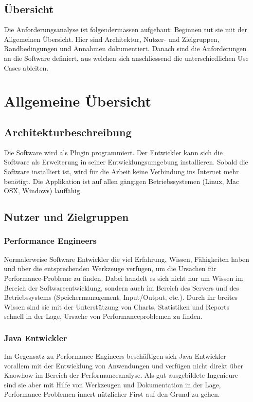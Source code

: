 \subsection{Übersicht}
Die Anforderungsanalyse ist folgendermassen aufgebaut: Beginnen tut sie mit der Allgemeinen Übersicht. Hier sind Architektur, Nutzer- und Zielgruppen, Randbedingungen und Annahmen dokumentiert. Danach sind die Anforderungen an die Software definiert, aus welchen sich anschliessend die unterschiedlichen Use Cases ableiten.
\section{Allgemeine Übersicht}\label{allgemeine_uebersicht}
\subsection{Architekturbeschreibung}
Die Software wird als Plugin programmiert. Der Entwickler kann sich die Software als Erweiterung in seiner Entwicklungsumgebung installieren. Sobald die Software installiert ist, wird für die Arbeit keine Verbindung ins Internet mehr benötigt. Die Applikation ist auf allen gängigen Betriebssystemen (Linux, Mac OSX, Windows) lauffähig.

\subsection{Nutzer und Zielgruppen}
\subsubsection{Performance Engineers}
Normalerweise Software Entwickler die viel Erfahrung, Wissen, Fähigkeiten haben und über die entsprechenden Werkzeuge verfügen, um die Ursachen für Performance-Probleme zu finden. Dabei handelt es sich nicht nur um Wissen im Bereich der Softwareentwicklung, sondern auch im Bereich des Servers und des Betriebssystems (Speichermanagement, Input/Output, etc.). Durch ihr breites Wissen sind sie mit der Unterstützung von Charts, Statistiken und Reports schnell in der Lage, Ursache von Performanceproblemen zu finden.

\subsubsection{Java Entwickler}
Im Gegensatz zu Performance Engineers beschäftigen sich Java Entwickler vorallem mit der Entwicklung von Anwendungen und verfügen nicht direkt über Knowhow im Bereich der Performanceanalyse. Als gut ausgebildete Ingenieure sind sie aber mit Hilfe von Werkzeugen und Dokumentation in der Lage, Performance Problemen innert nützlicher First auf den Grund zu gehen.


